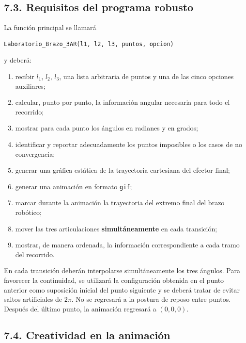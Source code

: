 \documentclass[12pt]{article}
\begin{document}
\subsection*{7.3. Requisitos del programa robusto}

La función principal se llamará

\begin{lstlisting}[language=Python]
Laboratorio_Brazo_3AR(l1, l2, l3, puntos, opcion)
\end{lstlisting}

y deberá:

\begin{enumerate}[label=\alph*)]
    \item recibir \(l_1\), \(l_2\), \(l_3\), una lista arbitraria de puntos y una de las cinco opciones auxiliares;
    \item calcular, punto por punto, la información angular necesaria para todo el recorrido;
    \item mostrar para cada punto los ángulos en radianes y en grados;
    \item identificar y reportar adecuadamente los puntos imposibles o los casos de no convergencia;
    \item generar una gráfica estática de la trayectoria cartesiana del efector final;
    \item generar una animación en formato \texttt{gif};
    \item marcar durante la animación la trayectoria del extremo final del brazo robótico;
    \item mover las tres articulaciones \textbf{simultáneamente} en cada transición;
    \item mostrar, de manera ordenada, la información correspondiente a cada tramo del recorrido.
\end{enumerate}

En cada transición deberán interpolarse simultáneamente los tres ángulos. Para favorecer la continuidad, se utilizará la configuración obtenida en el punto anterior como suposición inicial del punto siguiente y se deberá tratar de evitar saltos artificiales de \(2\pi\). No se regresará a la postura de reposo entre puntos. Después del último punto, la animación regresará a \((0,0,0)\).

\subsection*{7.4. Creatividad en la animación}
\end{document}
